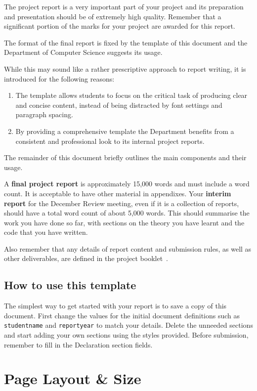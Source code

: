 \documentclass[]{final_report}
\begin{document}
The project report is a very important part of your project and its preparation and presentation should be of extremely high quality. Remember that a significant portion of the marks for your project are awarded for this report. 

The format of the final report is fixed by the template of this document and the Department of Computer Science suggests its usage. 

While this may sound like a rather prescriptive approach to report writing, it is introduced for the following reasons:
\begin{enumerate}
 \item The template allows students to focus on the critical task of producing clear and concise content, instead of being distracted by font settings and paragraph spacing. 
 \item By providing a comprehensive template the Department benefits from a consistent and professional look to its internal project reports.
\end{enumerate}

The remainder of this document briefly outlines the main components and their usage.

A \textbf{final project report} is approximately 15,000 words and must include a word count. It is acceptable to have other material in appendixes.  
Your \textbf{interim report} for the December Review meeting, even if it is a collection of reports, should have a total word count of about 5,000 words. 
This should summarise the work you have done so far, with sections on the theory you have learnt and the code that you have written.

Also remember that any details of report content and submission rules, as well as other deliverables, are defined in the project booklet~\cite{COHEN:2013}.

\section{How to use this template}

The simplest way to get started with your report is to save a copy of this document. 
First change the values for the initial document definitions such as \verb|studentname| and \verb|reportyear| to match your details.
Delete the unneeded sections and start adding your own sections using the styles provided.
Before submission, remember to fill in the Declaration section fields.

\chapter{Page Layout \& Size}
\end{document}
